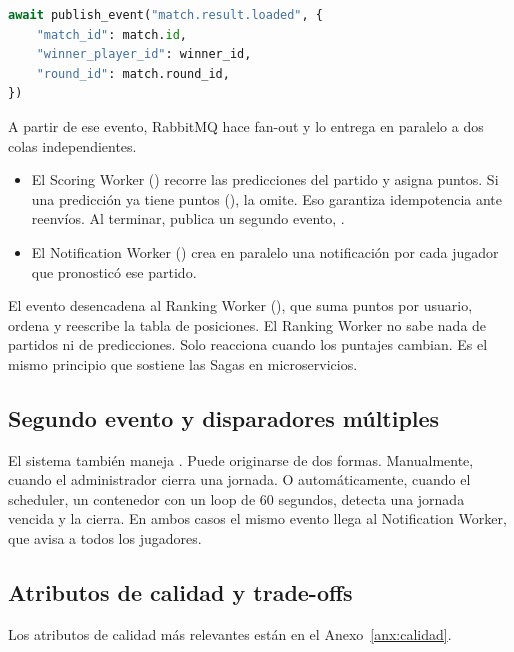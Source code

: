 \begin{lstlisting}[language=Python,caption={Publicación del evento tras cargar un resultado (\code{routers/admin.py}).}]
await publish_event("match.result.loaded", {
    "match_id": match.id,
    "winner_player_id": winner_id,
    "round_id": match.round_id,
})
\end{lstlisting}

A partir de ese evento, RabbitMQ hace fan-out y lo entrega en paralelo a dos colas independientes.

\begin{itemize}
\item El Scoring Worker () recorre las predicciones del partido y asigna puntos. Si una predicción ya tiene puntos (), la omite. Eso garantiza idempotencia ante reenvíos. Al terminar, publica un segundo evento, .
\item El Notification Worker () crea en paralelo una notificación por cada jugador que pronosticó ese partido.
\end{itemize}

El evento  desencadena al Ranking Worker (), que suma puntos por usuario, ordena y reescribe la tabla de posiciones. El Ranking Worker no sabe nada de partidos ni de predicciones. Solo reacciona cuando los puntajes cambian. Es el mismo principio que sostiene las Sagas en microservicios.

\subsection{Segundo evento y disparadores múltiples}

El sistema también maneja . Puede originarse de dos formas. Manualmente, cuando el administrador cierra una jornada. O automáticamente, cuando el scheduler, un contenedor con un loop de 60 segundos, detecta una jornada vencida y la cierra. En ambos casos el mismo evento llega al Notification Worker, que avisa a todos los jugadores.

\subsection{Atributos de calidad y trade-offs}

Los atributos de calidad más relevantes están en el Anexo~\ref{anx:calidad}.

